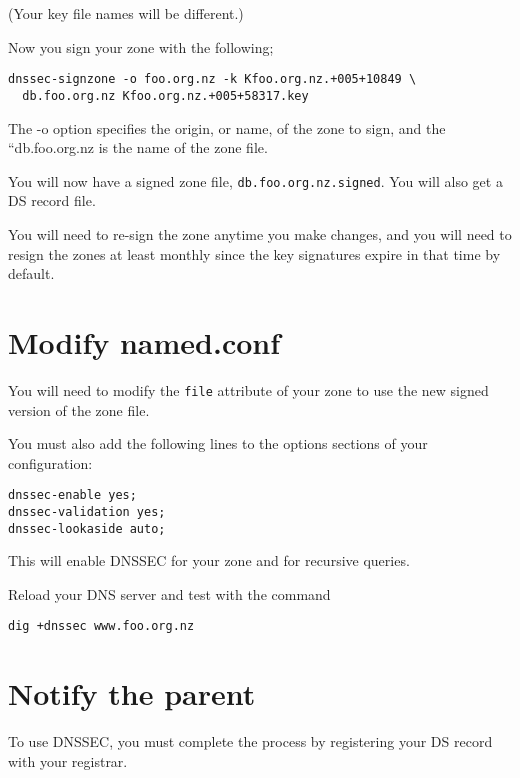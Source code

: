 \documentclass{article}
\begin{document}
(Your key file names will be different.)

Now you sign your zone with the following;
\begin{verbatim}
dnssec-signzone -o foo.org.nz -k Kfoo.org.nz.+005+10849 \
  db.foo.org.nz Kfoo.org.nz.+005+58317.key
\end{verbatim}

The -o option specifies the origin, or name, of the zone to sign, and the 
``db.foo.org.nz is the name of the zone file.




You will now have a signed zone file, \texttt{db.foo.org.nz.signed}.  
You will also get a DS record file.  

You will need to re-sign the zone anytime you make changes, and you will need to resign the zones at least monthly since the key signatures expire in that time by default.

\section{Modify named.conf}

You will need to modify the \texttt{file} attribute of your zone to use the new signed version of the zone file.

You must also add the following lines to the options sections of your configuration:

\begin{verbatim}
dnssec-enable yes;
dnssec-validation yes;
dnssec-lookaside auto;
\end{verbatim}

This will enable DNSSEC for your zone and for recursive queries.

Reload your DNS server and test with the command

\texttt{dig +dnssec www.foo.org.nz}


\section{Notify the parent}
To use DNSSEC, you must complete the process by registering your DS record with your registrar. 
\end{document}
